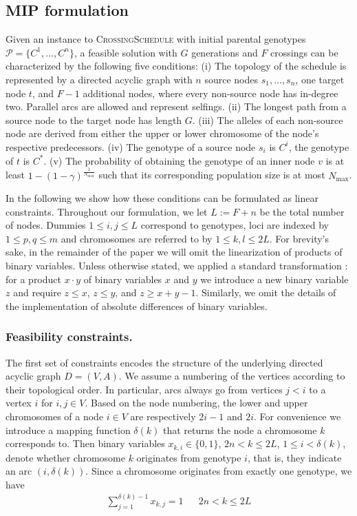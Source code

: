 \documentclass[runningheads]{llncs}
\begin{document}
\subsection{MIP formulation}
\label{sec:ilp}
Given an instance to \textsc{CrossingSchedule} with initial parental genotypes $\mathcal{P}=\{C^1,\dots,C^n\}$, a feasible solution with $G$ generations and $F$ crossings can be characterized by the following five conditions: (i) The topology of the schedule is represented by a directed acyclic graph with $n$ source nodes $s_1,\dots, s_n$, one target node $t$, and $F-1$ additional nodes, where every non-source node has in-degree two. Parallel arcs are allowed and represent selfings. (ii) The longest path from a source node to the target node has length $G$. (iii) The alleles of each non-source node are derived from either the upper or lower chromosome of the node's respective predecessors. (iv) The genotype of a source node $s_i$ is $C^i$, the genotype of $t$ is $C^*$. (v) The probability of obtaining the genotype of an inner node $v$ is at least $1 - (1 - \gamma)^\frac{1}{N_\mathrm{max}}$ such that its corresponding population size is at most $N_\mathrm{max}$.

In the following we show how these conditions can be formulated as linear constraints. Throughout our formulation, we let $L:=F+n$ be the total 
number of nodes. Dummies $1 \leq i,j \leq L$ correspond to genotypes, loci are indexed by $1 \leq p,q \leq m$ and chromosomes are referred to by $1 \leq k,l \leq 2L$. For brevity's sake, in the remainder of the paper we will omit the linearization of products of binary variables. Unless otherwise stated, we applied a standard transformation \cite{Bradley:1977}: for a product $x\cdot y$ of binary variables $x$ and $y$ we introduce a new binary variable $z$ and require $z\leq x$, $z\leq y$, and $z\geq x+y-1$.
Similarly, we omit the details of the implementation of absolute differences of binary variables.

\subsubsection{Feasibility constraints.}
\label{sec:feasibility}

The first set of constraints encodes the structure of the underlying directed acyclic graph $D=(V,A)$. We assume a numbering of the vertices
according to their topological order. In particular, arcs always go from vertices $j<i$ to a vertex $i$ for $i,j\in V$. Based on the node numbering, the lower and upper chromosomes of a node $i \in V$ are respectively $2i-1$ and $2i$. For convenience we introduce a mapping function $\delta(k)$ that returns the node a chromosome $k$ corresponds to.
Then binary variables $x_{k,i}\in\{0,1\}$, $2n < k \leq 2L$, $1 \leq i<\delta(k)$, denote whether chromosome $k$ originates from genotype $i$, that is, they indicate an arc $(i,\delta(k))$.
Since a chromosome originates from exactly one genotype, we have
\begin{align}
  \label{eq:ilp_x_1}
  \sum_{j=1}^{\delta(k)- 1} x_{k,j} = 1 && 2n < k \leq 2L
\end{align}
\end{document}

